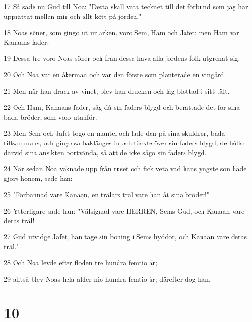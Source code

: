 \par 17 Så sade nu Gud till Noa: "Detta skall vara tecknet till det förbund som jag har upprättat mellan mig och allt kött på jorden."
\par 18 Noas söner, som gingo ut ur arken, voro Sem, Ham och Jafet; men Ham var Kanaans fader.
\par 19 Dessa tre voro Noas söner och från dessa hava alla jordens folk utgrenat sig.
\par 20 Och Noa var en åkerman och var den förste som planterade en vingård.
\par 21 Men när han drack av vinet, blev han drucken och låg blottad i sitt tält.
\par 22 Och Ham, Kanaans fader, såg då sin faders blygd och berättade det för sina båda bröder, som voro utanför.
\par 23 Men Sem och Jafet togo en mantel och lade den på sina skuldror, båda tillsammans, och gingo så baklänges in och täckte över sin faders blygd; de höllo därvid sina ansikten bortvända, så att de icke sågo sin faders blygd.
\par 24 När sedan Noa vaknade upp från ruset och fick veta vad hans yngste son hade gjort honom, sade han:
\par 25 "Förbannad vare Kanaan, en trälars träl vare han åt sina bröder!"
\par 26 Ytterligare sade han: "Välsignad vare HERREN, Sems Gud, och Kanaan vare deras träl!
\par 27 Gud utvidge Jafet, han tage sin boning i Sems hyddor, och Kanaan vare deras träl."
\par 28 Och Noa levde efter floden tre hundra femtio år;
\par 29 alltså blev Noas hela ålder nio hundra femtio år; därefter dog han.

\chapter{10}

